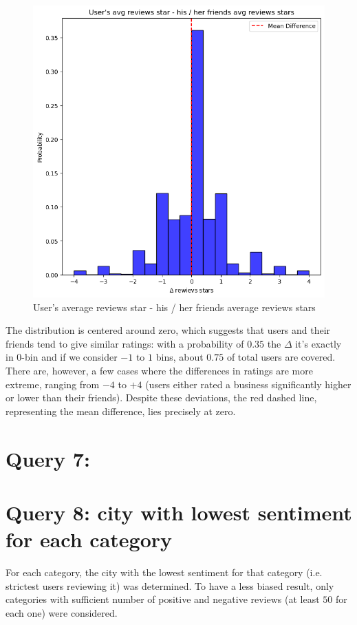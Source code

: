 \documentclass{Configuration_Files/PoliMi3i_thesis}
\begin{document}
\begin{figure}[H]
    \centering
    \includegraphics[width=3\columnwidth / 4]{imgs/query_6.png}
    \caption{User's average reviews star - his / her friends average reviews stars}
    \label{fig:query_6}
\end{figure}

\bigskip

The distribution is centered around zero, which suggests that users and their friends tend to give similar ratings: with a probability of $0.35$ the $\Delta$ it's exactly in $0$-bin and if we consider $-1$ to $1$ bins, about $0.75$ of total users are covered. There are, however, a few cases where the differences in ratings are more extreme, ranging from $-4$ to $+4$ (users either rated a business significantly higher or lower than their friends). Despite these deviations, the red dashed line, representing the mean difference, lies precisely at zero. 

\section{Query 7:}

\section{Query 8: city with lowest sentiment for each category}
For each category, the city with the lowest sentiment for that category (i.e. strictest users reviewing it) was determined. To have a less biased result, only categories with sufficient number of positive and negative reviews (at least $50$ for each one) were considered.
\end{document}
